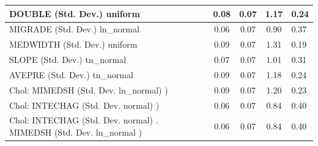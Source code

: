 \begin{table}
\begin{center}
\begin{tabular}{|l|l|c|c|c|l|}
			\hline
			DOUBLE (Std. Dev.) uniform &  & 0.08 & 0.07 & 1.17 & 0.24 \\
			\hline
			MIGRADE (Std. Dev.) ln_normal &  & 0.06 & 0.07 & 0.90 & 0.37 \\
			\hline
			MEDWIDTH (Std. Dev.) uniform &  & 0.09 & 0.07 & 1.31 & 0.19 \\
			\hline
			SLOPE (Std. Dev.) tn_normal &  & 0.07 & 0.07 & 1.01 & 0.31 \\
			\hline
			AVEPRE (Std. Dev.) tn_normal &  & 0.09 & 0.07 & 1.18 & 0.24 \\
			\hline
			 Chol: MIMEDSH (Std. Dev. ln_normal) ) &  & 0.09 & 0.07 & 1.20 & 0.23 \\
			\hline
			 Chol: INTECHAG (Std. Dev. normal) ) &  & 0.06 & 0.07 & 0.84 & 0.40 \\
			\hline
			 Chol: INTECHAG (Std. Dev. normal) . MIMEDSH (Std. Dev.   ln_normal ) &  & 0.06 & 0.07 & 0.84 & 0.40 \\
			\hline
		\end{tabular}
	\end{center}
\end{table}